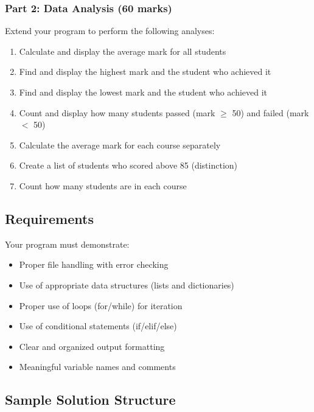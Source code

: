 \documentclass[a4paper,11pt]{article}
\theoremstyle{mytheor}
\begin{document}
\subsubsection*{Part 2: Data Analysis (60 marks)}

Extend your program to perform the following analyses:

\begin{enumerate}
    \item Calculate and display the average mark for all students
    \item Find and display the highest mark and the student who achieved it
    \item Find and display the lowest mark and the student who achieved it
    \item Count and display how many students passed (mark $\geq$ 50) and failed (mark $<$ 50)
    \item Calculate the average mark for each course separately
    \item Create a list of students who scored above 85 (distinction)
    \item Count how many students are in each course
\end{enumerate}

\subsection*{Requirements}

Your program must demonstrate:

\begin{itemize}
    \item Proper file handling with error checking
    \item Use of appropriate data structures (lists and dictionaries)
    \item Proper use of loops (for/while) for iteration
    \item Use of conditional statements (if/elif/else)
    \item Clear and organized output formatting
    \item Meaningful variable names and comments
\end{itemize}

\subsection*{Sample Solution Structure}
\end{document}
